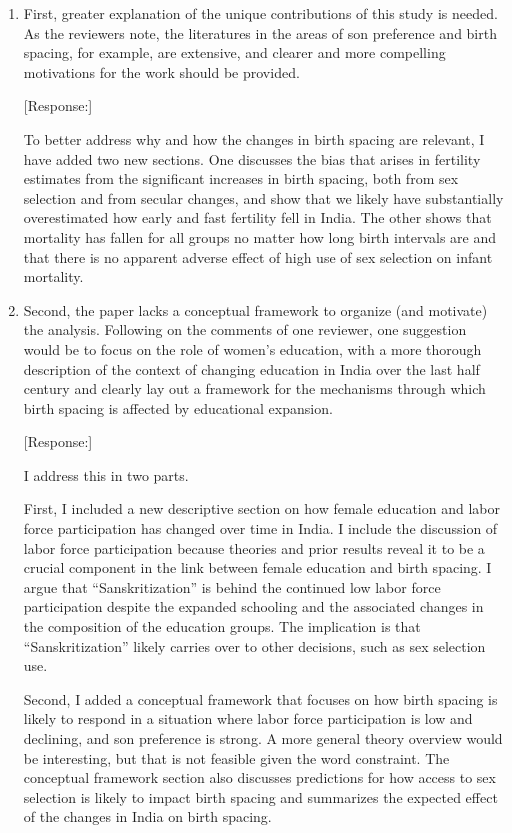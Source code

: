 \documentclass[letterpaper,12pt]{article}
\begin{document}
\begin{enumerate}

\item First, greater explanation of the unique contributions of this
study is needed. As the reviewers note, the literatures in the areas of
son preference and birth spacing, for example, are extensive, and
clearer and more compelling motivations for the work should be provided.

[Response:]

To better address why and how the changes in birth spacing are relevant,
I have added two new sections. One discusses the bias that arises in
fertility estimates from the significant increases in birth spacing,
both from sex selection and from secular changes, and show that we
likely have substantially overestimated how early and fast fertility
fell in India. The other shows that mortality has fallen for all groups
no matter how long birth intervals are and that there is no apparent
adverse effect of high use of sex selection on infant mortality.


\item Second, the paper lacks a conceptual framework to organize (and
motivate) the analysis. Following on the comments of one reviewer, one
suggestion would be to focus on the role of women’s education, with a
more thorough description of the context of changing education in India
over the last half century and clearly lay out a framework for the
mechanisms through which birth spacing is affected by educational
expansion.

[Response:]

I address this in two parts.

First, I included a new descriptive section on how female education and
labor force participation has changed over time in India. I include the
discussion of labor force participation because theories and prior
results reveal it to be a crucial component in the link between female
education and birth spacing. I argue that ``Sanskritization'' is behind
the continued low labor force participation despite the expanded
schooling and the associated changes in the composition of the education
groups.
The implication is that ``Sanskritization'' likely carries over to other decisions, such 
as sex selection use.

Second, I added a conceptual framework that focuses on how birth spacing
is likely to respond in a situation where labor force participation is
low and declining, and son preference is strong. A more general theory
overview would be interesting, but that is not feasible given the word
constraint. The conceptual framework section also discusses predictions
for how access to sex selection is likely to impact birth spacing and
summarizes the expected effect of the changes in India on birth spacing.


\end{enumerate}
\end{document}
